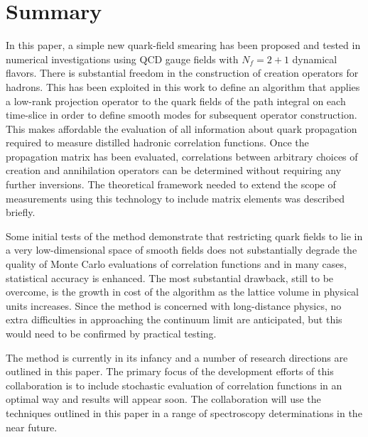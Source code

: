 \section{Summary}

In this paper, a simple new quark-field smearing has been proposed and tested in
numerical investigations using QCD gauge fields with $N_f=2+1$ dynamical
flavors. There is substantial freedom in the construction of creation operators
for hadrons.  This has been exploited in this work to define an algorithm
that applies a low-rank projection operator to the quark fields of the path
integral on each time-slice in order to define smooth modes for subsequent
operator construction.  This makes affordable the evaluation of all
information about quark propagation required to measure distilled hadronic
correlation functions.  Once the propagation matrix has been evaluated,
correlations between arbitrary choices of creation and annihilation
operators can be determined without requiring any further inversions. The
theoretical framework needed to extend the scope of measurements using this
technology to include matrix elements was described briefly.

Some initial tests of the method demonstrate that restricting quark fields to
lie in a very low-dimensional space of smooth fields does not substantially
degrade the quality of Monte Carlo evaluations of correlation functions and
in
many cases, statistical accuracy is enhanced. The most substantial drawback,
still to be overcome, is the growth in cost of the algorithm as the lattice
volume in physical units increases. Since the method is concerned with
long-distance physics, no extra difficulties in approaching the continuum
limit are anticipated, but this would need to be confirmed by practical
testing.

The method is currently in its infancy and a number of research directions are
outlined in this paper. The primary focus of the development efforts of this
collaboration is to include stochastic evaluation of correlation
functions in an optimal way and results will appear soon. The collaboration
will use the techniques outlined in this paper in a range of spectroscopy
determinations in the near future.
